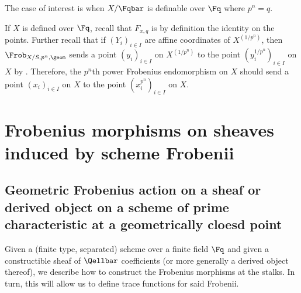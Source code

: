 

\begin{remark}
    The case of interest is when $X/\Fqbar$ is definable over $\Fq$ where $p^n = q$.
\end{remark}

\begin{remark}
    If $X$ is defined over $\Fq$, recall that $F_{x,q}$ is by definition the identity on the points. Further recall that if $(Y_i)_{i \in I}$ are affine coordinates of $X^{(1/p^n)}$, then $\Frob_{X/S, p^n, \geom}$ sends a point $(y_i)_{i \in I}$ on $X^{(1/p^n)}$ to the point $(y_i^{1/p^n})_{i \in I}$ on $X$ by . Therefore, the $p^n$th power Frobenius endomorphism on $X$ should send a point $(x_i)_{i \in I}$ on $X$ to the point $(x_i^{p^n})_{i \in I}$ on $X$.
\end{remark}

\section{Frobenius morphisms on sheaves induced by scheme Frobenii}

\subsection{Geometric Frobenius action on a sheaf or derived object on a scheme of prime characteristic at a geometrically cloesd point}

Given a (finite type, separated) scheme over a finite field $\Fq$ and given a constructible sheaf of $\Qellbar$ coefficients (or more generally a derived object thereof), we describe how to construct the Frobenius morphisms at the stalks. In turn, this will allow us to define trace functions for said Frobenii.


